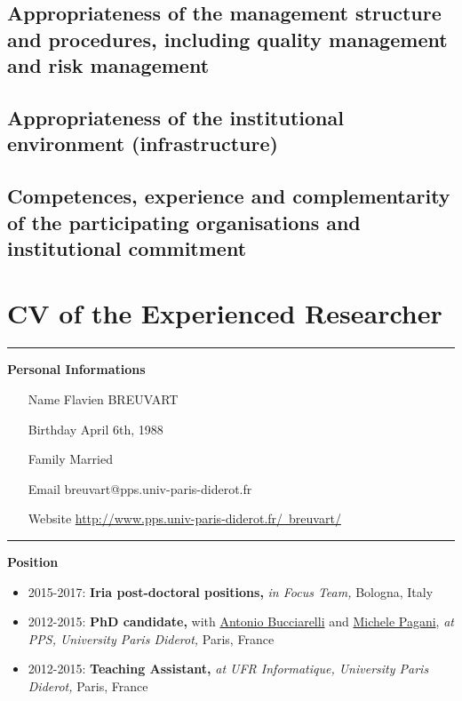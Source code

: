 \documentclass{article}[11pt]
\begin{document}
\subsection{Appropriateness of the management structure and procedures, including quality management and risk management}

\subsection{Appropriateness of the institutional environment (infrastructure)}

\subsection{Competences, experience and complementarity of the participating organisations and institutional commitment}



\section{CV of the Experienced Researcher}

\newcommand\entry[5]{\item[#1]{\bf #2} #3 {\em #4} #5}

\noindent \rule{5.5em}{7pt} {\large \bf Personal Informations} \nobreak
\begin{itemize}[itemindent=0em,leftmargin=6em, labelsep=1em]
\item[Name] Flavien BREUVART
\item[Birthday] April 6th, 1988
\item[Family] Married 
\item[Email] breuvart@pps.univ-paris-diderot.fr
\item[Website] \href{http://www.pps.univ-paris-diderot.fr/~breuvart/}{http://www.pps.univ-paris-diderot.fr/~breuvart/}
\end{itemize}

\noindent \rule{5.5em}{7pt} {\large \bf Position} \nobreak
\begin{itemize}[itemindent=0em,leftmargin=6em, labelsep=1em]
\entry{2015-2017:}{Iria post-doctoral positions,}{}{in Focus Team,}{Bologna, Italy}{}
\entry{2012-2015:}{PhD candidate,}{with \href{http://www.pps.jussieu.fr/~buccia/}{Antonio Bucciarelli} and \href{http://www.pps.univ-paris-diderot.fr/~pagani/}{Michele Pagani},}{at PPS, University Paris Diderot,}{Paris, France}
\entry{2012-2015:}{Teaching Assistant,}{}{at UFR Informatique, University Paris Diderot,}{Paris, France}
\end{itemize}
\end{document}
